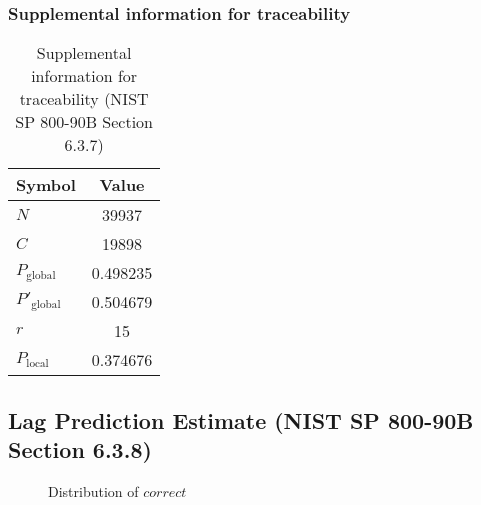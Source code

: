 \documentclass[a3paper,xelatex,english]{bxjsarticle}
\begin{document}
\subsubsection{Supplemental information for traceability}
\renewcommand{\arraystretch}{1.8}
\begin{table}[h]
\caption{Supplemental information for traceability (NIST SP 800-90B Section 6.3.7)}
\begin{center}
\begin{tabular}{|l|c|}
\hline 
\rowcolor{anotherlightblue} %
Symbol				& Value \\ \hline 
$N$				& 39937\\ \hline 
$C$				& 19898\\ \hline 
$P_{\textrm{global}}$				& 0.498235\\ \hline 
$P'_{\textrm{global}}$			& 0.504679\\ \hline 
$r$				& 15\\ \hline 
$P_{\textrm{local}}$ 			& 0.374676\\ \hline
\end{tabular}
\end{center}
\end{table}
\renewcommand{\arraystretch}{1.4}
\clearpage
\subsection{Lag Prediction Estimate (NIST SP 800-90B Section 6.3.8)}
\begin{figure}[htbp]
\centering

\caption{Distribution of $correct$}
\end{figure}
\end{document}
